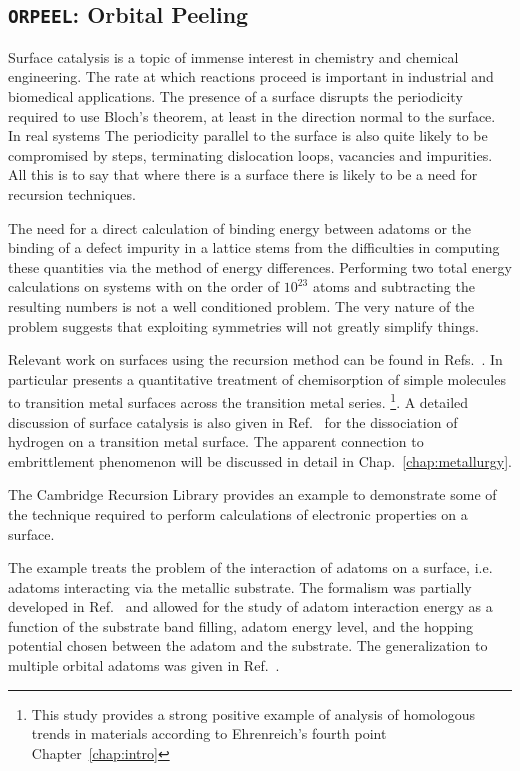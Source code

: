 \subsection{\texttt{ORPEEL}: Orbital Peeling}
Surface catalysis is a topic of immense interest in chemistry and chemical engineering.
The rate at which reactions proceed is important in industrial and biomedical 
applications. The presence of a surface disrupts the periodicity required to use Bloch's theorem,
at least in the direction normal to the surface. In real systems
The periodicity parallel to the surface is also quite likely to 
be compromised by steps, terminating dislocation loops, 
vacancies and impurities. All this is to say that where 
there is a surface there is likely to be a need for recursion
techniques.

The need for a direct calculation of binding energy between adatoms or
the binding of a defect impurity in a lattice stems from the difficulties in computing 
these quantities via the method of energy differences. Performing two total
energy calculations on systems with on the order of $10^{23}$ atoms and subtracting the
resulting numbers is not a well conditioned problem. 
The very nature of the problem suggests that exploiting symmetries
will not greatly simplify things.

Relevant work on surfaces using the recursion method can be found in 
Refs.~\cite{haydock72, kelly73, kelly74, kelly74b, burke76, haydock79, haydock82}.
In particular \cite{haydock79} presents a quantitative treatment of chemisorption of simple
molecules to transition metal surfaces across the transition metal series. 
\footnote{This study provides a strong positive example of analysis of homologous 
trends in materials according to Ehrenreich's fourth point Chapter~\ref{chap:intro}}.
A detailed discussion of surface catalysis is also given in Ref.~\cite{haydock80}
for the dissociation of hydrogen on a transition metal surface. The apparent
connection to embrittlement phenomenon will be discussed in detail in Chap.~\ref{chap:metallurgy}.

The Cambridge Recursion Library provides an example 
to demonstrate some of the technique required to perform 
calculations of electronic properties on a surface. 

The example treats the problem of the interaction of adatoms on a 
surface, i.e. adatoms interacting via the metallic substrate.
The formalism was partially developed in Ref.~\cite{einstein73} and 
allowed for the study of adatom interaction energy 
as a function of the substrate band filling, adatom energy level, and the hopping
potential chosen between the adatom and the substrate. The generalization
to multiple orbital adatoms was given in Ref.~\cite{burke76}. 

